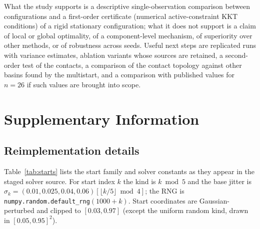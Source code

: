 \documentclass{article} %
\begin{document}
What the study supports is a descriptive single-observation comparison between configurations and a first-order certificate (numerical active-constraint KKT conditions) of a rigid stationary configuration; what it does not support is a claim of local or global optimality, of a component-level mechanism, of superiority over other methods, or of robustness across seeds. Useful next steps are replicated runs with variance estimates, ablation variants whose sources are retained, a second-order test of the contacts, a comparison of the contact topology against other basins found by the multistart, and a comparison with published values for $n=26$ if such values are brought into scope.

\clearpage



\clearpage
\appendix
\section{Supplementary Information}

\subsection{Reimplementation details}\label{sec:si-repro}
Table~\ref{tab:starts} lists the start family and solver constants as they appear in the staged solver source. For start index $k$ the kind is $k \bmod 5$ and the base jitter is $\sigma_k=(0.01,0.025,0.04,0.06)[\lfloor k/5\rfloor \bmod 4]$; the RNG is \texttt{numpy.random.default\_rng}$(1000+k)$. Start coordinates are Gaussian-perturbed and clipped to $[0.03,0.97]$ (except the uniform random kind, drawn in $[0.05,0.95]^2$).
\end{document}
